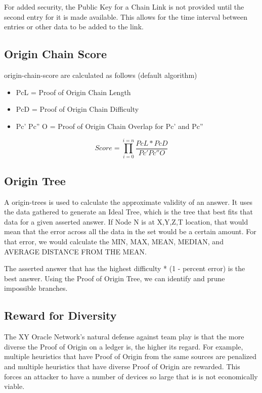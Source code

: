 \documentclass{article}
\begin{document}
For added security, the Public Key for a Chain Link is not provided until the second entry for it is made available.  This allows for the time interval between entries or other data to be added to the link.

\subsection {Origin Chain Score}
\Gls{origin-chain-score} are calculated as follows (default algorithm)

\begin{itemize}
\item PcL = Proof of Origin Chain Length
\item PcD = Proof of Origin Chain Difficulty
\item Pc' Pc'' O = Proof of Origin Chain Overlap for Pc' and Pc''
\end{itemize}

\begin{equation*} \label{eq1}
Score = \prod_{i=0}^{i=n} \frac{PcL*PcD}{Pc' Pc'' O}
\end{equation*}

\subsection {Origin Tree}
A \Glspl{origin-tree} is used to calculate the approximate validity of an answer.  It uses the data gathered to generate an Ideal Tree, which is the tree that best fits that data for a given asserted answer.  If Node N is at X,Y,Z,T location, that would mean that the error across all the data in the set would be a certain amount.  For that error, we would calculate the MIN, MAX, MEAN, MEDIAN, and AVERAGE DISTANCE FROM THE MEAN.

The asserted answer that has the highest difficulty * (1 - percent error) is the best answer.  Using the Proof of Origin Tree, we can identify and prune impossible branches.

\subsection {Reward for Diversity}
The XY Oracle Network's natural defense against team play is that the more diverse the Proof of Origin on a ledger is, the higher its regard.  For example, multiple heuristics that have Proof of Origin from the same sources are penalized and multiple heuristics that have diverse Proof of Origin are rewarded.  This forces an attacker to have a number of devices so large that is is not economically viable.
\end{document}
